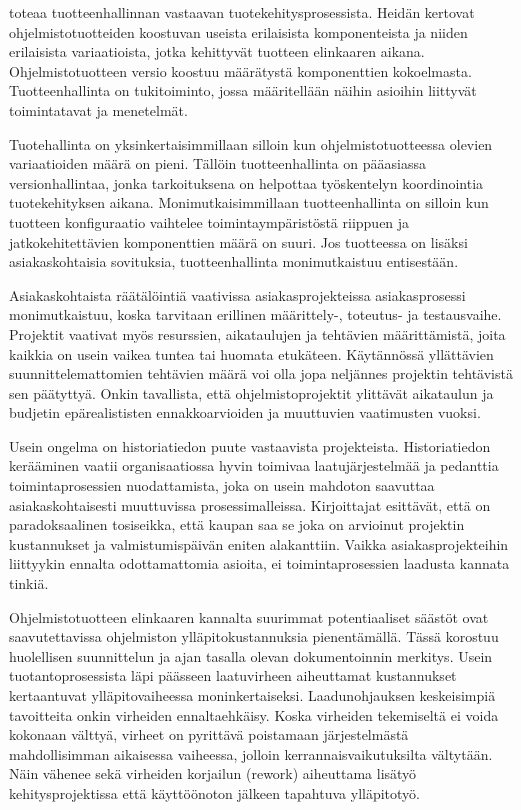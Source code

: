 \documentclass[finnish,12pt,a4paper,pdftex]{article}
\begin{document}
\cite{okaytannot} toteaa tuotteenhallinnan vastaavan tuotekehitysprosessista. Heidän kertovat ohjelmistotuotteiden koostuvan useista erilaisista komponenteista ja niiden erilaisista variaatioista, jotka kehittyvät tuotteen elinkaaren aikana. Ohjelmistotuotteen versio koostuu määrätystä komponenttien kokoelmasta. Tuotteenhallinta on tukitoiminto, jossa määritellään näihin asioihin liittyvät toimintatavat ja menetelmät. 

Tuotehallinta on yksinkertaisimmillaan silloin kun ohjelmistotuotteessa olevien variaatioiden määrä on pieni. Tällöin tuotteenhallinta on pääasiassa versionhallintaa, jonka tarkoituksena on helpottaa työskentelyn koordinointia tuotekehityksen aikana. Monimutkaisimmillaan tuotteenhallinta on silloin kun tuotteen konfiguraatio vaihtelee toimintaympäristöstä riippuen ja jatkokehitettävien komponenttien määrä on suuri. Jos tuotteessa on lisäksi asiakaskohtaisia sovituksia, tuotteenhallinta monimutkaistuu entisestään. \citep{okaytannot}

Asiakaskohtaista räätälöintiä vaativissa asiakasprojekteissa asiakasprosessi monimutkaistuu, koska tarvitaan erillinen määrittely-, toteutus- ja testausvaihe. Projektit vaativat myös resurssien, aikataulujen ja tehtävien määrittämistä, joita kaikkia on usein vaikea tuntea tai huomata etukäteen. Käytännössä yllättävien suunnittelemattomien tehtävien määrä voi olla jopa neljännes projektin tehtävistä sen päätyttyä. Onkin tavallista, että ohjelmistoprojektit ylittävät aikataulun ja budjetin epärealististen ennakkoarvioiden ja muuttuvien vaatimusten vuoksi. \citep{okaytannot}

Usein ongelma on historiatiedon puute vastaavista projekteista. Historiatiedon kerääminen vaatii organisaatiossa hyvin toimivaa laatujärjestelmää ja pedanttia toimintaprosessien nuodattamista, joka on usein mahdoton saavuttaa asiakaskohtaisesti muuttuvissa prosessimalleissa. Kirjoittajat esittävät, että on paradoksaalinen tosiseikka, että kaupan saa se joka on arvioinut projektin kustannukset ja valmistumispäivän eniten alakanttiin. Vaikka asiakasprojekteihin liittyykin ennalta odottamattomia asioita, ei toimintaprosessien laadusta kannata tinkiä. \citep{ohjelmistotuotanto, okaytannot}

Ohjelmistotuotteen elinkaaren kannalta suurimmat potentiaaliset säästöt ovat saavutettavissa ohjelmiston ylläpitokustannuksia pienentämällä. Tässä korostuu huolellisen suunnittelun ja ajan tasalla olevan dokumentoinnin merkitys. Usein tuotantoprosessista läpi päässeen laatuvirheen aiheuttamat kustannukset kertaantuvat ylläpitovaiheessa moninkertaiseksi. Laadunohjauksen keskeisimpiä tavoitteita onkin virheiden ennaltaehkäisy. Koska virheiden tekemiseltä ei voida kokonaan välttyä, virheet on pyrittävä poistamaan järjestelmästä mahdollisimman aikaisessa vaiheessa, jolloin kerrannaisvaikutuksilta vältytään. Näin vähenee sekä virheiden korjailun (rework) aiheuttama lisätyö kehitysprojektissa että käyttöönoton jälkeen tapahtuva ylläpitotyö. \citep{ohjelmistotuotanto}
\end{document}
